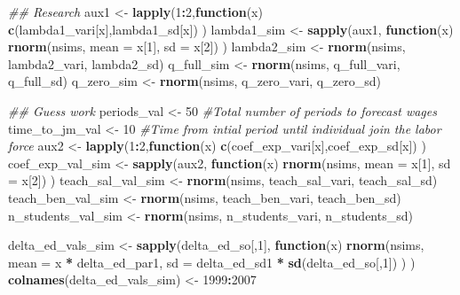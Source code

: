 \documentclass[]{article}
\newenvironment{Shaded}{\begin{snugshade}}{\end{snugshade}}
\newcommand{\CommentTok}[1]{\textcolor[rgb]{0.56,0.35,0.01}{\textit{#1}}}
\newcommand{\ControlFlowTok}[1]{\textcolor[rgb]{0.13,0.29,0.53}{\textbf{#1}}}
\newcommand{\DataTypeTok}[1]{\textcolor[rgb]{0.13,0.29,0.53}{#1}}
\newcommand{\DecValTok}[1]{\textcolor[rgb]{0.00,0.00,0.81}{#1}}
\newcommand{\KeywordTok}[1]{\textcolor[rgb]{0.13,0.29,0.53}{\textbf{#1}}}
\newcommand{\NormalTok}[1]{#1}
\newcommand{\OperatorTok}[1]{\textcolor[rgb]{0.81,0.36,0.00}{\textbf{#1}}}
\newcommand{\StringTok}[1]{\textcolor[rgb]{0.31,0.60,0.02}{#1}}
\begin{document}
\begin{Shaded}
\begin{Highlighting}[]
      \CommentTok{## Research}
\NormalTok{      aux1 <-}\StringTok{ }\KeywordTok{lapply}\NormalTok{(}\DecValTok{1}\OperatorTok{:}\DecValTok{2}\NormalTok{,}\ControlFlowTok{function}\NormalTok{(x) }\KeywordTok{c}\NormalTok{(lambda1_vari[x],lambda1_sd[x]) )}
\NormalTok{      lambda1_sim <-}\StringTok{ }\KeywordTok{sapply}\NormalTok{(aux1, }\ControlFlowTok{function}\NormalTok{(x)  }\KeywordTok{rnorm}\NormalTok{(nsims, }\DataTypeTok{mean =}\NormalTok{ x[}\DecValTok{1}\NormalTok{], }\DataTypeTok{sd =}\NormalTok{ x[}\DecValTok{2}\NormalTok{]) ) }
\NormalTok{      lambda2_sim <-}\StringTok{ }\KeywordTok{rnorm}\NormalTok{(nsims, lambda2_vari, lambda2_sd)}
\NormalTok{      q_full_sim <-}\StringTok{ }\KeywordTok{rnorm}\NormalTok{(nsims, q_full_vari, q_full_sd)}
\NormalTok{      q_zero_sim <-}\StringTok{ }\KeywordTok{rnorm}\NormalTok{(nsims, q_zero_vari, q_zero_sd)}
      
      \CommentTok{## Guess work}
\NormalTok{      periods_val <-}\StringTok{ }\DecValTok{50}           \CommentTok{#Total number of periods to forecast wages}
\NormalTok{      time_to_jm_val <-}\StringTok{ }\DecValTok{10}        \CommentTok{#Time from intial period until individual join the labor force}
\NormalTok{      aux2 <-}\StringTok{ }\KeywordTok{lapply}\NormalTok{(}\DecValTok{1}\OperatorTok{:}\DecValTok{2}\NormalTok{,}\ControlFlowTok{function}\NormalTok{(x) }\KeywordTok{c}\NormalTok{(coef_exp_vari[x],coef_exp_sd[x]) )}
\NormalTok{      coef_exp_val_sim <-}\StringTok{ }\KeywordTok{sapply}\NormalTok{(aux2, }\ControlFlowTok{function}\NormalTok{(x)  }\KeywordTok{rnorm}\NormalTok{(nsims, }\DataTypeTok{mean =}\NormalTok{ x[}\DecValTok{1}\NormalTok{], }\DataTypeTok{sd =}\NormalTok{ x[}\DecValTok{2}\NormalTok{]) )     }
\NormalTok{      teach_sal_val_sim <-}\StringTok{ }\KeywordTok{rnorm}\NormalTok{(nsims, teach_sal_vari, teach_sal_sd)}
\NormalTok{      teach_ben_val_sim <-}\StringTok{ }\KeywordTok{rnorm}\NormalTok{(nsims, teach_ben_vari, teach_ben_sd)}
\NormalTok{      n_students_val_sim <-}\StringTok{ }\KeywordTok{rnorm}\NormalTok{(nsims, n_students_vari, n_students_sd)}
      
\NormalTok{      delta_ed_vals_sim <-}\StringTok{ }\KeywordTok{sapply}\NormalTok{(delta_ed_so[,}\DecValTok{1}\NormalTok{], }\ControlFlowTok{function}\NormalTok{(x)  }\KeywordTok{rnorm}\NormalTok{(nsims, }\DataTypeTok{mean =} 
\NormalTok{                                                                          x }\OperatorTok{*}\StringTok{ }\NormalTok{delta_ed_par1, }
                                                                        \DataTypeTok{sd =}\NormalTok{ delta_ed_sd1 }\OperatorTok{*}\StringTok{ }\KeywordTok{sd}\NormalTok{(delta_ed_so[,}\DecValTok{1}\NormalTok{]) ) )}
      \KeywordTok{colnames}\NormalTok{(delta_ed_vals_sim) <-}\StringTok{ }\DecValTok{1999}\OperatorTok{:}\DecValTok{2007}
      

\end{Highlighting}
\end{Shaded}
\end{document}

